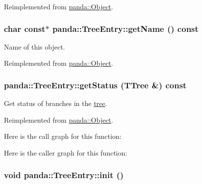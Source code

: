 Reimplemented from \hyperlink{classpanda_1_1Object_a69038e1ce9bc60222bb0ba7e7f933bd5}{panda::Object}.\hypertarget{classpanda_1_1TreeEntry_afbd2a566ad42c6f5e4ce0183cde65c20}{
\subsubsection[{getName}]{\setlength{\rightskip}{0pt plus 5cm}char const$\ast$ panda::TreeEntry::getName () const}}
\label{classpanda_1_1TreeEntry_afbd2a566ad42c6f5e4ce0183cde65c20}


Name of this object. 

Reimplemented from \hyperlink{classpanda_1_1Object_a670b2150de796b6fc742fa9de30cd6b1}{panda::Object}.\hypertarget{classpanda_1_1TreeEntry_a3be7000fca4d0dd356488643aaa752dd}{
\subsubsection[{getStatus}]{ panda::TreeEntry::getStatus (TTree \&) const}}
\label{classpanda_1_1TreeEntry_a3be7000fca4d0dd356488643aaa752dd}


Get status of branches in the \hyperlink{namespacepanda_1_1tree}{tree}. 

Reimplemented from \hyperlink{classpanda_1_1Object_ad575503e839f7aa6cc47434b3a24cb80}{panda::Object}.

Here is the call graph for this function:

Here is the caller graph for this function:\hypertarget{classpanda_1_1TreeEntry_a734130107a3568d87eb6570ab9b9ee60}{
\subsubsection[{init}]{\setlength{\rightskip}{0pt plus 5cm}void panda::TreeEntry::init ()}}
\label{classpanda_1_1TreeEntry_a734130107a3568d87eb6570ab9b9ee60}


